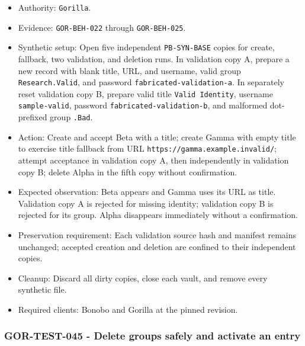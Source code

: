 \documentclass[
  letterpaper,
]{article}
\newcommand{\passthrough}[1]{#1}
\providecommand{\tightlist}{%
  \setlength{\itemsep}{0pt}\setlength{\parskip}{0pt}}
\begin{document}
\begin{itemize}
\tightlist
\item
  Authority: \passthrough{\lstinline!Gorilla!}.
\item
  Evidence: \nolinkurl{GOR-BEH-022} through \nolinkurl{GOR-BEH-025}.
\item
  Synthetic setup: Open five independent \nolinkurl{PB-SYN-BASE} copies for create, fallback, two validation, and
  deletion runs. In validation copy A, prepare a new record with blank title, URL, and username, valid group
  \nolinkurl{Research.Valid}, and password \nolinkurl{fabricated-validation-a}. In separately reset validation copy B,
  prepare valid title \passthrough{\lstinline!Valid Identity!}, username \nolinkurl{sample-valid}, password
  \nolinkurl{fabricated-validation-b}, and malformed dot-prefixed group \passthrough{\lstinline!.Bad!}.
\item
  Action: Create and accept Beta with a title; create Gamma with empty title to exercise title fallback from URL
  \nolinkurl{https://gamma.example.invalid/}; attempt acceptance in validation copy A, then independently in validation
  copy B; delete Alpha in the fifth copy without confirmation.
\item
  Expected observation: Beta appears and Gamma uses its URL as title. Validation copy A is rejected for missing
  identity; validation copy B is rejected for its group. Alpha disappears immediately without a confirmation.
\item
  Preservation requirement: Each validation source hash and manifest remains unchanged; accepted creation and deletion
  are confined to their independent copies.
\item
  Cleanup: Discard all dirty copies, close each vault, and remove every synthetic file.
\item
  Required clients: Bonobo and Gorilla at the pinned revision.
\end{itemize}

\subsubsection{GOR-TEST-045 - Delete groups safely and activate an
entry}\label{gor-test-045---delete-groups-safely-and-activate-an-entry}
\end{document}
